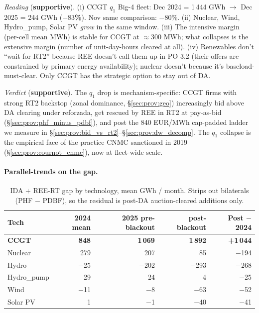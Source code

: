 \documentclass[11pt,a4paper]{article}
\begin{document}
\textit{Reading} (\textbf{supportive}). (i) CCGT $q_1$ Big-4 fleet: Dec 2024 = 1\,444 GWh $\to$ Dec 2025 = 244 GWh (\textbf{$-83$\%}). Nov same comparison: $-80$\%. (ii) Nuclear, Wind, Hydro\_pump, Solar PV \emph{grow} in the same window. (iii) The intensive margin (per-cell mean MWh) is stable for CCGT at $\approx$300 MWh; what collapses is the extensive margin (number of unit-day-hours cleared at all). (iv) Renewables don't ``wait for RT2'' because REE doesn't call them up in PO 3.2 (their offers are constrained by primary energy availability); nuclear doesn't because it's baseload-must-clear. Only CCGT has the strategic option to stay out of DA.

\textit{Verdict} (\textbf{supportive}). The $q_1$ drop is mechanism-specific: CCGT firms with strong RT2 backstop (zonal dominance, \S\ref{sec:prov:geo}) increasingly bid above DA clearing under reforzada, get rescued by REE in RT2 at pay-as-bid (\S\ref{sec:prov:phf_minus_pdbf}), and post the 840 EUR/MWh cap-padded ladder we measure in \S\ref{sec:prov:bid_vs_rt2}--\S\ref{sec:prov:dw_decomp}. The $q_1$ collapse is the empirical face of the practice CNMC sanctioned in 2019 (\S\ref{sec:prov:cournot_cnmc}), now at fleet-wide scale.

\paragraph{Parallel-trends on the gap.}

\begin{table}[H]
\centering
\caption{IDA $+$ REE-RT gap by technology, mean GWh / month. Strips out bilaterals (PHF $-$ PDBF), so the residual is post-DA auction-cleared additions only.}
\label{tab:gap_pretrends}
\begin{tabular}{l r r r r}
\toprule
Tech & 2024 mean & 2025 pre-blackout & post-blackout & Post $-$ 2024 \\
\midrule
\textbf{CCGT}   & \textbf{848}  & \textbf{1\,069} & \textbf{1\,892} & \textbf{+1\,044} \\
Nuclear         &  279          &     207         &      85         &   $-$194  \\
Hydro           & $-$25         &  $-$202         &   $-$293        &   $-$268  \\
Hydro\_pump     &   29          &      24         &       4         &   $-$25   \\
Wind            & $-$11         &   $-$8          &   $-$63         &   $-$52   \\
Solar PV        &    1          &   $-$1          &   $-$40         &   $-$41   \\
\bottomrule
\end{tabular}
\end{table}
\end{document}
